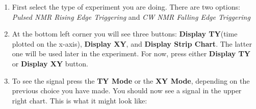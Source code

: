 \documentclass{../lab}
\begin{document}
\begin{enumerate}
    \item First select the type of experiment you are doing. There are two options: \emph{Pulsed NMR Rising Edge Triggering} and \emph{CW NMR Falling Edge Triggering}

    \item At the bottom left corner you will see three buttons: \textbf{Display TY}(time plotted on the x-axis), \textbf{Display XY}, and \textbf{Display Strip Chart}. The latter one will be used later in the experiment. For now, press either \textbf{Display TY} or \textbf{Display XY} button.
    
    \item To see the signal press the \textbf{TY Mode} or the \textbf{XY Mode}, depending on the previous choice you have made. You should now see a signal in the upper right chart. This is what it might look like:
    

\end{enumerate}
\end{document}
